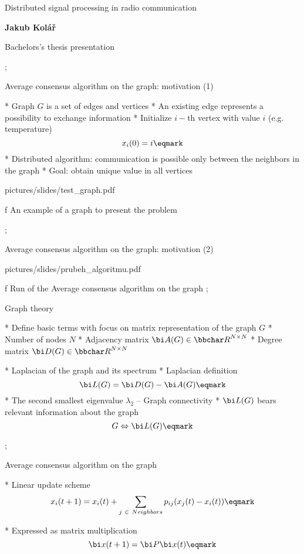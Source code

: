 

\worktype[B/EN]

\slideshow 

\tit Distributed signal processing \nl in radio communication

\subtit\bf Jakub Kolář

\subtit\rm Bachelors's thesis presentation

\pg; %


\sec Average consensus algorithm \nl on the graph: motivation (1)

* Graph $G$ is a set of edges and vertices
* An existing edge represents a possibility to exchange information
* Initialize $i-$th vertex with value $i$ (e.g. temperature)
$$x_i(0)=i \eqmark$$
* Distributed algorithm: communication is possible only between \nl the neighbors  in the graph
* Goal: obtain unique value in all vertices 
\medskip
\centerline{\picw=9cm \inspic pictures/slides/test_graph.pdf } 
\caption/f { An example of a graph to present the problem }

\pg;

\sec Average consensus algorithm \nl on the graph: motivation (2)


\medskip
\centerline{\picw=12cm \inspic pictures/slides/prubeh_algoritmu.pdf } 
\caption/f { Run of the  Average consensus algorithm on the graph }
\pg;

\sec Graph theory

* Define basic terms with focus on matrix representation of the graph $G$
\begitems
*   Number of nodes $N$
*   Adjacency matrix ${\bi A}(G) \in {\bbchar R}^{N \times {N}} $
*   Degree matrix  ${\bi D}(G) \in {\bbchar R}^{N\times{N}} $
\enditems

* Laplacian of the graph and its spectrum
\begitems
  * Laplacian definition  $${\bi L}(G) = {\bi D}(G) - {\bi A}(G) \eqmark $$
  * The second smallest eigenvalue $\lambda_2$ -- Graph connectivity
\enditems
*  ${\bi L}(G)$ bears relevant information about the graph 
$$ G \Leftrightarrow {\bi L}(G) \eqmark$$

\pg;

\sec Average consensus algorithm \nl on the graph

* Linear update scheme \nl $$ x_i(t+1) = x_i(t)+\sum_{{j \ \in \  Neighbors}} p_{ij}(x_j(t)-x_i(t)) \eqmark $$

* Expressed as matrix multiplication \nl $$ {\bi x}(t+1) = {\bi P} {\bi x}(t) \eqmark $$

